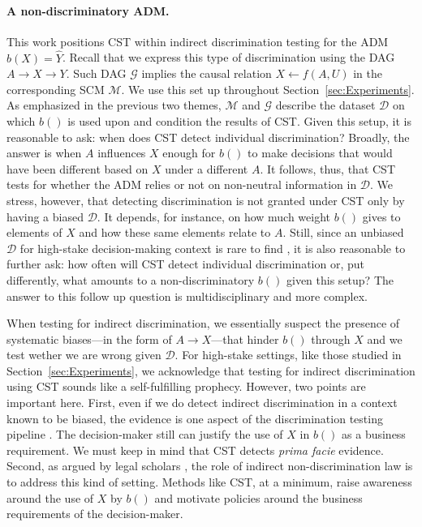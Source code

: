 \paragraph{A non-discriminatory ADM.}
This work positions CST within indirect discrimination testing for the ADM $b(X)=\hat{Y}$.
%
Recall that we express this type of discrimination using the DAG $A \rightarrow X \rightarrow Y$. 
Such DAG $\mathcal{G}$ implies the causal relation $X \leftarrow f(A, U)$ in the corresponding SCM $\mathcal{M}$.
We use this set up throughout Section~\ref{sec:Experiments}.
As emphasized in the previous two themes, $\mathcal{M}$ and $\mathcal{G}$ describe the dataset $\mathcal{D}$ on which $b()$ is used upon and condition the results of CST.
%
Given this setup, it is reasonable to ask: when does CST detect individual discrimination?
Broadly, the answer is when $A$ influences $X$ enough for $b()$ to make decisions that would have been different based on $X$ under a different $A$.
It follows, thus, that CST tests for whether the ADM relies or not on non-neutral information in $\mathcal{D}$. 
We stress, however, that detecting discrimination is not granted under CST only by having a biased $\mathcal{D}$.
It depends, for instance, on how much weight $b()$ gives to elements of $X$ and how these same elements relate to $A$.
Still,
since an unbiased $\mathcal{D}$ for high-stake decision-making context is rare to find \parencite{DBLP:journals/ethicsit/AlvarezCEFFFGMPLRSSZR24},
it is also reasonable to further ask: how often will CST detect individual discrimination or, put differently, what amounts to a non-discriminatory $b()$ given this setup? The answer to this follow up question is multidisciplinary and more complex.

When testing for indirect discrimination, we essentially suspect the presence of systematic biases---in the form of $A \rightarrow X$---that hinder $b()$ through $X$ and we test wether we are wrong given $\mathcal{D}$.
%
For high-stake settings, like those studied in Section~\ref{sec:Experiments}, we acknowledge that testing for indirect discrimination using CST sounds like a self-fulfilling prophecy.
However, two points are important here.
%
First, even if we do detect indirect discrimination in a context known to be biased, the evidence is one aspect of the discrimination testing pipeline \parencite{DBLP:conf/fat/WeertsXTOP23}. 
The decision-maker still can justify the use of $X$ in $b()$ as a business requirement.
We must keep in mind that CST detects \textit{prima facie} evidence.
%
Second, as argued by legal scholars \parencite{Hacker2018TeachingFairness, Xenidis2020_TunningEULaw, Wachter2020BiasPreserving}, the role of indirect non-discrimination law is to address this kind of setting. 
Methods like CST, at a minimum, raise awareness around the use of $X$ by $b()$ and motivate policies around the business requirements of the decision-maker. 

